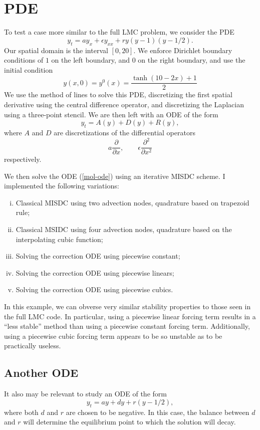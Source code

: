 \documentclass[12pt]{article}
\begin{document}
\section{PDE}
To test a case more similar to the full LMC problem, we consider the PDE
\begin{equation}
    \label{pde}
    y_t = ay_x + \epsilon y_{xx} + ry(y-1)(y-1/2).
\end{equation}
Our spatial domain is the interval $[0, 20]$.
We enforce Dirichlet boundary conditions of $1$ on the left boundary, and 
$0$ on the right boundary, and use the initial condition
\[
    y(x, 0) = y^0(x) = \frac{\tanh(10-2x)+1}{2}
\]
We use the method of lines to solve this PDE, discretizing the first 
spatial derivative using the central difference operator, and discretizing 
the Laplacian using a three-point stencil. We are then left with an ODE of the 
form
\begin{equation}
    \label{mol-ode}
    y_t = A(y) + D(y) + R(y),
\end{equation}
where $A$ and $D$ are discretizations of the differential operators
\[
    a\frac{\partial}{\partial x},\qquad\epsilon \frac{\partial^2}{\partial x^2}
\]
respectively.

We then solve the ODE (\ref{mol-ode}) using an iterative MISDC scheme. I 
implemented the following variations:
\begin{enumerate}[i.]
    \item Classical MISDC using two advection nodes, quadrature based on 
        trapezoid rule;
    \item Classical MSIDC using four advection nodes, quadrature based on
        the interpolating cubic function;
    \item Solving the correction ODE using piecewise constant;
    \item Solving the correction ODE using piecewise linears;
    \item Solving the correction ODE using piecewise cubics.
\end{enumerate}
In this example, we can obverse very similar stability properties to those 
seen in the full LMC code. In particular, using a piecewise linear forcing term 
results in a ``less stable'' method than using a piecewise constant forcing 
term. Additionally, using a piecewise cubic forcing term appears to be so 
unstable as to be practically useless.

\subsection{Another ODE}
It also may be relevant to study an ODE of the form
\[
    y_t = ay + dy + r(y - 1/2),
\]
where both $d$ and $r$ are chosen to be negative. In this case, the balance 
between $d$ and $r$ will determine the equilibrium point to which the 
solution will decay.
\end{document}
